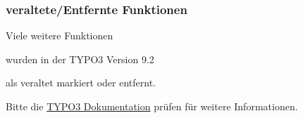 
\begin{frame}[fragile]
	\frametitle{veraltete/Entfernte Funktionen}

	\vspace{0.6cm}
	\begin{center}
		Viele weitere Funktionen
	\end{center}
	\vspace{-0.8cm}
	\begin{center}
		wurden in der TYPO3 Version 9.2
	\end{center}
	\vspace{-0.8cm}
	\begin{center}
		als veraltet markiert oder entfernt.
	\end{center}
	\vspace{-0.6cm}
	\begin{center}
		Bitte die \href{https://docs.typo3.org/typo3cms/extensions/core/latest/Changelog/9.3/Index.html#deprecation}{TYPO3 Dokumentation} prüfen für weitere Informationen.
	\end{center}

\end{frame}

